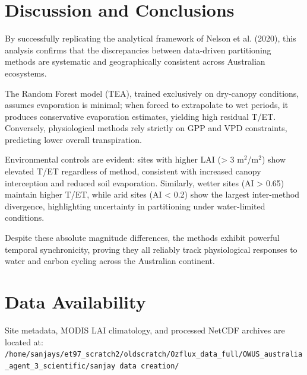 \documentclass[11pt,a4paper]{article}
\begin{document}
\section{Discussion and Conclusions}
By successfully replicating the analytical framework of Nelson et al. (2020), this analysis confirms that the discrepancies between data-driven partitioning methods are systematic and geographically consistent across Australian ecosystems.

The Random Forest model (TEA), trained exclusively on dry-canopy conditions, assumes evaporation is minimal; when forced to extrapolate to wet periods, it produces conservative evaporation estimates, yielding high residual T/ET. Conversely, physiological methods rely strictly on GPP and VPD constraints, predicting lower overall transpiration.

Environmental controls are evident: sites with higher LAI (> 3 m$^2$/m$^2$) show elevated T/ET regardless of method, consistent with increased canopy interception and reduced soil evaporation. Similarly, wetter sites (AI > 0.65) maintain higher T/ET, while arid sites (AI < 0.2) show the largest inter-method divergence, highlighting uncertainty in partitioning under water-limited conditions.

Despite these absolute magnitude differences, the methods exhibit powerful temporal synchronicity, proving they all reliably track physiological responses to water and carbon cycling across the Australian continent.

\section*{Data Availability}
Site metadata, MODIS LAI climatology, and processed NetCDF archives are located at: \\
\texttt{/home/sanjays/et97\_scratch2/oldscratch/Ozflux\_data\_full/OWUS\_australia\_agent\_3\_scientific/sanjay data creation/}
\end{document}
